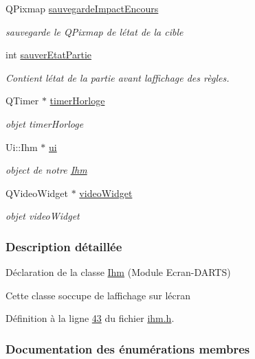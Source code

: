 \begin{DoxyCompactItemize}
Q\+Pixmap \hyperlink{class_ihm_a659c67bf5d1ba3104fb10f23d8b91b37}{sauvegarde\+Impact\+Encours}
\begin{DoxyCompactList}\small\item\em sauvegarde le Q\+Pixmap de l\textquotesingle{}état de la cible \end{DoxyCompactList}\item 
int \hyperlink{class_ihm_a1a9d23dd4defa0b88d1e4a56ce807e45}{sauver\+Etat\+Partie}
\begin{DoxyCompactList}\small\item\em Contient l\textquotesingle{}état de la partie avant l\textquotesingle{}affichage des règles. \end{DoxyCompactList}\item 
Q\+Timer $\ast$ \hyperlink{class_ihm_a21ea35b212966fa2805241ea6237d351}{timer\+Horloge}
\begin{DoxyCompactList}\small\item\em objet timer\+Horloge \end{DoxyCompactList}\item 
Ui\+::\+Ihm $\ast$ \hyperlink{class_ihm_a0ac5f47856566ceeeca1720109bf70ea}{ui}
\begin{DoxyCompactList}\small\item\em object de notre \hyperlink{class_ihm}{Ihm} \end{DoxyCompactList}\item 
Q\+Video\+Widget $\ast$ \hyperlink{class_ihm_a011827612654af9b19bc8c42045e3c06}{video\+Widget}
\begin{DoxyCompactList}\small\item\em objet video\+Widget \end{DoxyCompactList}\end{DoxyCompactItemize}


\subsubsection{Description détaillée}
Déclaration de la classe \hyperlink{class_ihm}{Ihm} (Module Ecran-\/\+D\+A\+R\+TS) 

Cette classe s\textquotesingle{}occupe de l\textquotesingle{}affichage sur l\textquotesingle{}écran 

Définition à la ligne \hyperlink{ihm_8h_source_l00043}{43} du fichier \hyperlink{ihm_8h_source}{ihm.\+h}.



\subsubsection{Documentation des énumérations membres}
\mbox{\label{class_ihm_a472c7a7bec7e6e0230842f78ace4833e}} 
